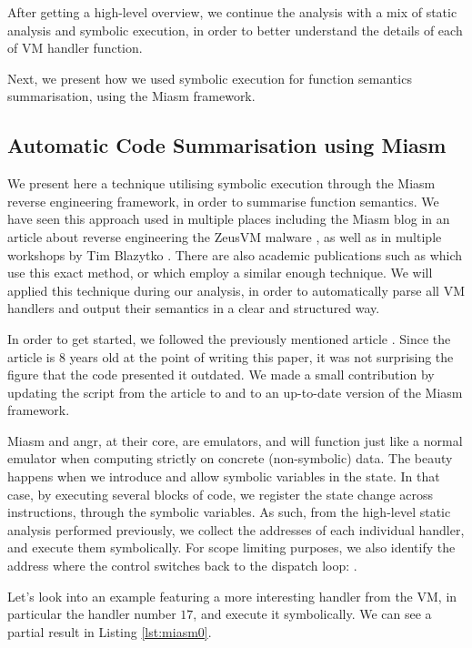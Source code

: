 After getting a high-level overview, we continue the analysis with a mix of static analysis and symbolic execution, in order to better understand the details of each of \gls{VM} handler function.

Next, we present how we used symbolic execution for function semantics summarisation, using the Miasm \cite{miasm} framework.

\subsection{Automatic Code Summarisation using Miasm}
\label{sec:miasm}

We present here a technique utilising symbolic execution through the Miasm \cite{miasm} reverse engineering framework, in order to summarise function semantics. We have seen this approach used in multiple places including the Miasm blog in an article about reverse engineering the ZeusVM malware \cite{zeusvm_miasm}, as well as in multiple workshops by Tim Blazytko \cite{tim_miasm}. There are also academic publications such as \cite{liang2018} which use this exact method, or \cite{symbolic_deobf_2018} which employ a similar enough technique. We will applied this technique during our analysis, in order to automatically parse all \gls{VM} handlers and output their semantics in a clear and structured way. 

In order to get started, we followed the previously mentioned article \cite{zeusvm_miasm}. Since the article is 8 years old at the point of writing this paper, it was not surprising the figure that the code presented it outdated. We made a small contribution by updating the script from the article to  and to an up-to-date version of the Miasm framework.

Miasm and angr, at their core, are emulators, and will function just like a normal emulator when computing strictly on concrete (non-symbolic) data. The beauty happens when we introduce and allow symbolic variables in the state. In that case, by executing several blocks of code, we register the state change across instructions, through the symbolic variables. As such, from the high-level static analysis performed previously, we collect the addresses of each individual handler, and execute them symbolically. For scope limiting purposes, we also identify the address where the control switches back to the dispatch loop: . 

Let's look into an example featuring a more interesting handler from the  \gls{VM}, in particular the handler number $17$, and execute it symbolically. We can see a partial result in Listing \ref{lst:miasm0}. 

